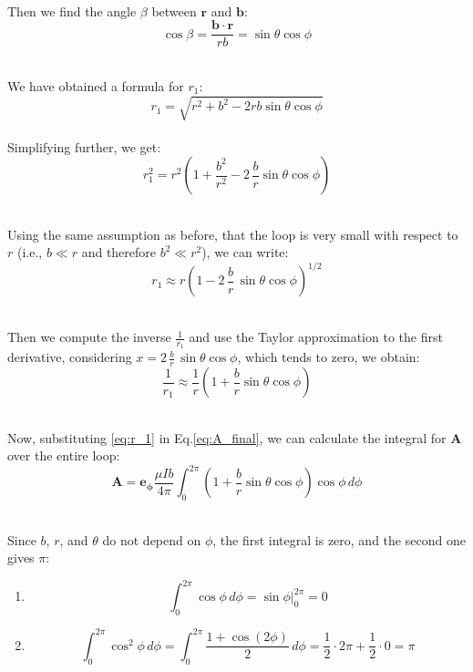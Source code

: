 \documentclass[main]{subfiles}
\begin{document}
\noindent\\
Then we find the angle \(\beta\) between 
\( \mathbf{r} \) and \( \mathbf{b} \):
$$
 \cos \beta = \frac{\mathbf{b} \cdot \mathbf{r}}{r b} 
 = \sin \theta \cos \phi
$$

\noindent\\
We have obtained a formula for \( r_1 \):
$$
 r_1 = \sqrt{r^2 + b^2 - 2 r b \sin \theta \cos \phi}
$$
\noindent\\
Simplifying further, we get:
$$
 r_1^2 = r^2 \left( 1 + \frac{b^2}{r^2} - 2\, 
 \frac{b}{r} \sin \theta \cos \phi \right)
$$

\noindent\\
Using the same assumption as before, that the loop is 
very small with respect to \( r \) (i.e., \( b \ll r \) 
and therefore \( b^2 \ll r^2 \)), we can write:
$$
 r_1 \approx r \left( 1 - 2 \, \frac{b}{r} \, 
 \sin \theta \cos \phi \right)^{1/2}
$$

\noindent\\
Then we compute the inverse \( \frac{1}{r_1} \) and 
use the Taylor approximation to the first derivative, 
considering \( x = 2 \, \frac{b }{r} \, \sin \theta 
\cos \phi \), which tends to zero, we obtain:
\begin{equation}
 \frac{1}{r_1} \approx \frac{1}{r} 
 \left( 1 + \frac{b}{r} \sin \theta \cos \phi \right)
    \label{eq:r_1}
\end{equation}

\noindent\\
Now, substituting \ref{eq:r_1} in Eq.\ref{eq:A_final}, we 
can calculate the integral for \( \mathbf{A} \) over 
the entire loop:
$$
 \mathbf{A} = \mathbf{e_\phi} \frac{\mu I b}{4 \pi} 
    \int_{0}^{2\pi} \left( 1 + \frac{b}{r} \sin \theta 
 \cos \phi \right) \cos \phi \, d\phi
$$

\noindent\\
Since \( b \), \( r \), and $\theta$ do not depend on 
$\phi$, the first integral is zero, and the second one 
gives $\pi$:
\begin{enumerate}[label=(\arabic*)]
    \item 
    \parbox{\textwidth}{
    \[
        \int_0^{2\pi} \cos \phi \, d\phi = \sin \phi \Big|_0^{2\pi} = 0
    \]
 }

    \item 
    \parbox{\textwidth}{
    \[
        \int_{0}^{2\pi} \cos^2 \phi \, d\phi = \int_{0}^{2\pi} 
 \frac{1 + \cos(2\phi)}{2} \, d\phi = \frac{1}{2} \cdot 2\pi 
 + \frac{1}{2} \cdot 0 = \pi
    \]
 }
\end{enumerate}
\end{document}
